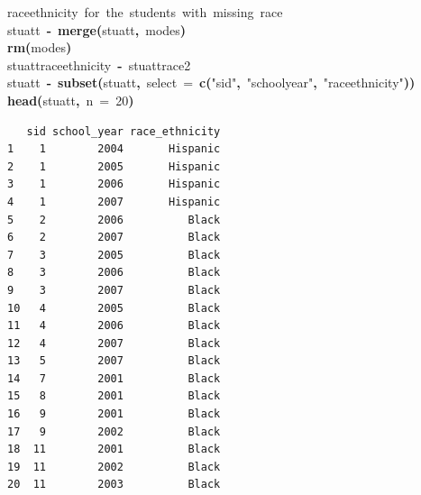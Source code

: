 \documentclass[12pt]{article}
\makeatletter
\newcommand{\hlnumber}[1]{\textcolor[rgb]{0,0,0}{#1}}%
\newcommand{\hlfunctioncall}[1]{\textcolor[rgb]{0.501960784313725,0,0.329411764705882}{\textbf{#1}}}%
\newcommand{\hlstring}[1]{\textcolor[rgb]{0.6,0.6,1}{#1}}%
\newcommand{\hlkeyword}[1]{\textcolor[rgb]{0,0,0}{\textbf{#1}}}%
\newcommand{\hlargument}[1]{\textcolor[rgb]{0.690196078431373,0.250980392156863,0.0196078431372549}{#1}}%
\newcommand{\hlcomment}[1]{\textcolor[rgb]{0.180392156862745,0.6,0.341176470588235}{#1}}%
\newcommand{\hlassignement}[1]{\textcolor[rgb]{0,0,0}{\textbf{#1}}}%
\newcommand{\hlsymbol}[1]{\textcolor[rgb]{0,0,0}{#1}}%
\newcommand{\hlstd}[1]{\textcolor[rgb]{0,0,0}{#1}}%
\newenvironment{kframe}{%
 \def\FrameCommand##1{\hskip\@totalleftmargin \hskip-\fboxsep
 \colorbox{shadecolor}{##1}\hskip-\fboxsep
     \hskip-\linewidth \hskip-\@totalleftmargin \hskip\columnwidth}%
 \MakeFramed {\advance\hsize-\width
   \@totalleftmargin\z@ \linewidth\hsize
   \@setminipage}}%
 {\par\unskip\endMakeFramed}
\newenvironment{knitrout}{}{} %
\makeatother
\begin{document}
\begin{knitrout}
\begin{kframe}
\begin{flushleft}
\hlstd{}\hlcomment{\usebox{\hlnormalsizeboxhash}{\ }race\usebox{\hlnormalsizeboxunderscore}ethnicity{\ }for{\ }the{\ }students{\ }with{\ }missing{\ }race}\hspace*{\fill}\\
\hlstd{}\hlsymbol{stuatt}{\ }\hlassignement{\usebox{\hlnormalsizeboxlessthan}-}{\ }\hlfunctioncall{merge}\hlkeyword{(}\hlsymbol{stuatt}\hlkeyword{,}{\ }\hlsymbol{modes}\hlkeyword{)}\hspace*{\fill}\\
\hlstd{}\hlfunctioncall{rm}\hlkeyword{(}\hlsymbol{modes}\hlkeyword{)}\hspace*{\fill}\\
\hlstd{}\hlsymbol{stuatt}\hlkeyword{\usebox{\hlnormalsizeboxdollar}}\hlsymbol{race\usebox{\hlnormalsizeboxunderscore}ethnicity}{\ }\hlassignement{\usebox{\hlnormalsizeboxlessthan}-}{\ }\hlsymbol{stuatt}\hlkeyword{\usebox{\hlnormalsizeboxdollar}}\hlsymbol{race2}\hspace*{\fill}\\
\hlstd{}\hlsymbol{stuatt}{\ }\hlassignement{\usebox{\hlnormalsizeboxlessthan}-}{\ }\hlfunctioncall{subset}\hlkeyword{(}\hlsymbol{stuatt}\hlkeyword{,}{\ }\hlargument{select}{\ }\hlargument{=}{\ }\hlfunctioncall{c}\hlkeyword{(}\hlstring{"{}sid"{}}\hlkeyword{,}{\ }\hlstring{"{}school\usebox{\hlnormalsizeboxunderscore}year"{}}\hlkeyword{,}{\ }\hlstring{"{}race\usebox{\hlnormalsizeboxunderscore}ethnicity"{}}\hlkeyword{)}\hlkeyword{)}\hspace*{\fill}\\
\hlstd{}\hlfunctioncall{head}\hlkeyword{(}\hlsymbol{stuatt}\hlkeyword{,}{\ }\hlargument{n}{\ }\hlargument{=}{\ }\hlnumber{20}\hlkeyword{)}\mbox{}
\normalfont
\end{flushleft}
\begin{verbatim}
   sid school_year race_ethnicity
1    1        2004       Hispanic
2    1        2005       Hispanic
3    1        2006       Hispanic
4    1        2007       Hispanic
5    2        2006          Black
6    2        2007          Black
7    3        2005          Black
8    3        2006          Black
9    3        2007          Black
10   4        2005          Black
11   4        2006          Black
12   4        2007          Black
13   5        2007          Black
14   7        2001          Black
15   8        2001          Black
16   9        2001          Black
17   9        2002          Black
18  11        2001          Black
19  11        2002          Black
20  11        2003          Black
\end{verbatim}
\end{kframe}
\end{knitrout}
\end{document}
